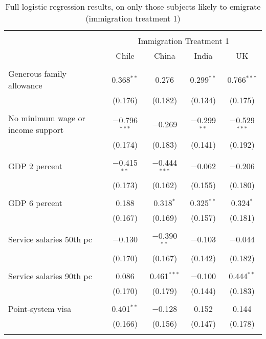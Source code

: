 
\begin{table}[!htbp] \centering 
  \caption{Full logistic regression results, on only those subjects likely to emigrate (immigration treatment 1)} 
  \label{} 
\begin{tabular}{@{\extracolsep{5pt}}lcccc} 
\\[-1.8ex]\hline 
\hline \\[-1.8ex] 
 & \multicolumn{4}{c}{Immigration Treatment 1} \\ 
\cline{2-5} 
 & Chile & China & India & UK \\ 
\hline \\[-1.8ex] 
 Generous family allowance & 0.368$^{**}$ & 0.276 & 0.299$^{**}$ & 0.766$^{***}$ \\ 
  & (0.176) & (0.182) & (0.134) & (0.175) \\ 
  & & & & \\ 
 No minimum wage or income support & $-$0.796$^{***}$ & $-$0.269 & $-$0.299$^{**}$ & $-$0.529$^{***}$ \\ 
  & (0.174) & (0.183) & (0.141) & (0.192) \\ 
  & & & & \\ 
 GDP 2 percent & $-$0.415$^{**}$ & $-$0.444$^{***}$ & $-$0.062 & $-$0.206 \\ 
  & (0.173) & (0.162) & (0.155) & (0.180) \\ 
  & & & & \\ 
 GDP 6 percent & 0.188 & 0.318$^{*}$ & 0.325$^{**}$ & 0.324$^{*}$ \\ 
  & (0.167) & (0.169) & (0.157) & (0.181) \\ 
  & & & & \\ 
 Service salaries 50th pc & $-$0.130 & $-$0.390$^{**}$ & $-$0.103 & $-$0.044 \\ 
  & (0.170) & (0.167) & (0.142) & (0.182) \\ 
  & & & & \\ 
 Service salaries 90th pc & 0.086 & 0.461$^{***}$ & $-$0.100 & 0.444$^{**}$ \\ 
  & (0.170) & (0.179) & (0.144) & (0.183) \\ 
  & & & & \\ 
 Point-system visa & 0.401$^{**}$ & $-$0.128 & 0.152 & 0.144 \\ 
  & (0.166) & (0.156) & (0.147) & (0.178) \\ 
  & & & & \\ 

\end{tabular}
\end{table}
